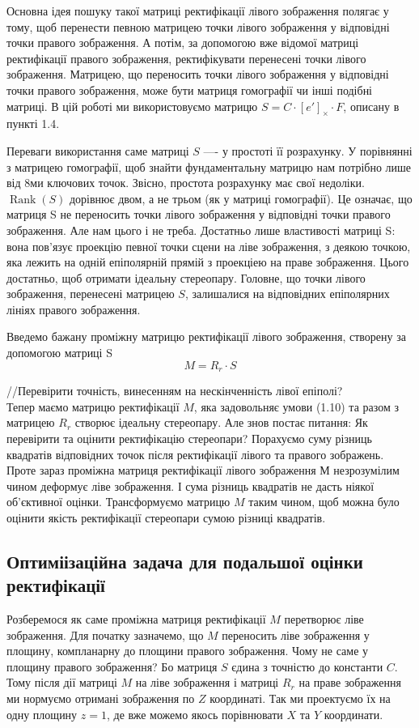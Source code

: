 Основна ідея пошуку такої матриці ректифікації лівого зображення полягає 
у тому, щоб перенести певною матрицею точки лівого зображення у відповідні 
точки правого зображення. А потім, за допомогою вже відомої матриці ректифікації 
правого зображення, ректифікувати перенесені точки лівого зображення. 
Матрицею, що переносить точки лівого зображення у відповідні точки правого 
зображення, може бути матриця гомографії чи інші подібні матриці. 
В цій роботі ми використовуємо матрицю $S = C \cdot {[e']}_\times \cdot F$, 
описану в пункті 1.4. 

Переваги використання саме матриці $S$ —- у простоті її розрахунку. У 
порівнянні з матрицею гомографії, щоб знайти фундаментальну матрицю нам 
потрібно лише від 8ми ключових точок. Звісно, простота розрахунку має свої 
недоліки. $\operatorname{Rank}(S)$ дорівнює двом, а не трьом (як у матриці 
гомографії). Це означає, що матриця S не переносить точки лівого зображення 
у відповідні точки правого зображення. Але нам цього і не треба. Достатньо 
лише властивості матриці S: вона пов'язує проекцію певної точки сцени на 
ліве зображення, з деякою точкою, яка лежить на одній епіполярній прямій 
з проекціею на праве зображення. Цього достатньо, щоб отримати ідеальну 
стереопару. Головне, що точки лівого зображення, перенесені матрицею $S$,
залишалися на відповідних епіполярних лініях правого зображення.

Введемо бажану проміжну матрицю ректифікації лівого зображення, створену 
за допомогою матриці S
\begin{equation}
	M = R_r \cdot S
\end{equation}

//Перевірити точність, винесенням на нескінченність лівої епіполі?\\
Тепер маємо матрицю ректифікації $M$, яка задовольняє умови (1.10) та 
разом з матрицею $R_r$ створює ідеальну стереопару. Але знов постає питання: 
Як перевірити та оцінити ректифікацію стереопари? Порахуємо суму різниць
квадратів відповідних точок після ректифікації лівого та правого зображень. 
Проте зараз проміжна матриця ректифікації лівого зображення $М$ незрозумілим 
чином деформує ліве зображення. І сума різниць квадратів не дасть ніякої 
об'єктивної оцінки. Трансформуємо матрицю $M$ таким чином, щоб можна було 
оцінити якість ректифікації стереопари сумою різниці квадратів.


\subsection{Оптиміізаційна задача для подальшої оцінки ректифікації}
Розберемося як саме проміжна матриця ректифікації $M$ перетворює ліве 
зображення. Для початку зазначемо, що $M$ переносить ліве зображення у 
площину, компланарну до площини правого зображення. Чому не саме у площину 
правого зображення? Бо матриця $S$ єдина з точністю до константи $C$. 
Тому після дії матриці $M$ на ліве зображення і матриці $R_r$ на праве 
зображення ми нормуємо отримані зображення по $Z$ координаті. Так ми 
проектуємо їх на одну площину $z=1$, де вже можемо якось порівнювати
$X$ та $Y$ координати.

